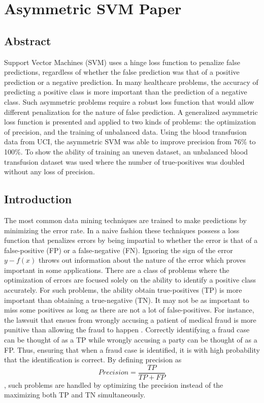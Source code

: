 \chapter{Asymmetric SVM Paper}\label{chapter:SVMpaper}
\section{Abstract}\label{Abstract}
Support Vector Machines (SVM) uses a hinge loss function to penalize false predictions, regardless of whether the false prediction was that of a positive prediction or a negative prediction. In many healthcare problems, the accuracy of predicting a positive class is more important than the prediction of a negative class. Such asymmetric problems require a robust loss function that would allow different penalization for the nature of false prediction. A generalized asymmetric loss function is presented and applied to two kinds of problems: the optimization of precision, and the training of unbalanced data. Using the blood transfusion data from UCI, the asymmetric SVM was able to improve precision from 76\% to 100\%. To show the ability of training an uneven dataset, an unbalanced blood transfusion dataset was used where the number of true-positives was doubled without any loss of precision.

\section{Introduction}\label{Introduction}

The most common data mining techniques are trained to make predictions by minimizing the error rate. In a naive fashion these techniques possess a loss function that penalizes errors by being impartial to whether the error is that of a false-positive (FP) or a false-negative (FN). Ignoring the sign of the error $y-f(x)$ throws out information about the nature of the error which proves important in some applications. There are a class of problems where the optimization of errors are focused solely on the ability to identify a positive class accurately. For such problems, the ability obtain true-positives (TP) is more important than obtaining a true-negative (TN). It may not be as important to miss some positives as long as there are not a lot of false-positives. For instance, the lawsuit that ensues from wrongly accusing a patient of medical fraud is more punitive than allowing the fraud to happen \citep{Liou08}. Correctly identifying a fraud case can be thought of as a TP while wrongly accusing a party can be thought of as a FP. Thus, ensuring that when a fraud case is identified, it is with high probability that the identification is correct. By defining precision as
 \begin{equation} \label{Eq:precision}
Precision=\frac{TP}{TP+FP}
\end{equation}
, such problems are handled by optimizing the precision instead of the maximizing both TP and TN simultaneously. 

